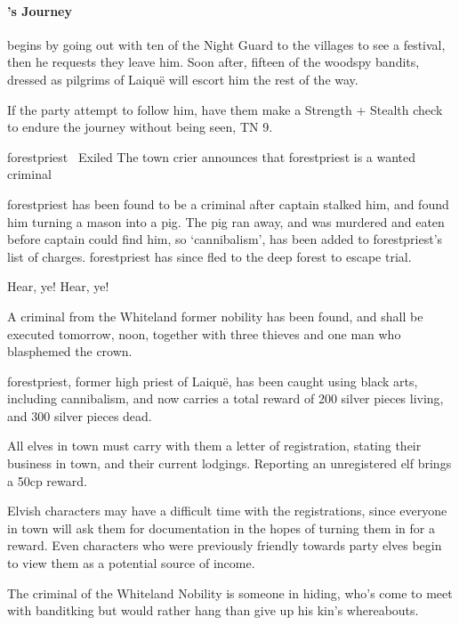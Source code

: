 \begin{multicols}{2}
\paragraph{'s Journey}
begins by going out with ten of the Night Guard to the villages to see a festival, then he requests they leave him.
Soon after, fifteen of the woodspy bandits, dressed as pilgrims of Laiqu\"e will escort him the rest of the way.

If the party attempt to follow him, have them make a Strength + Stealth check to endure the journey without being seen, TN 9.



{\Gls{forestpriest}~ Exiled}%
{The town crier announces that \gls{forestpriest} is a wanted criminal}%

\Gls{forestpriest} has been found to be a criminal after \gls{captain} stalked him, and found him turning a mason into a pig.
The pig ran away, and was murdered and eaten before \gls{captain} could find him, so `cannibalism', has been added to \gls{forestpriest}'s list of charges.
\Gls{forestpriest} has since fled to the deep forest to escape trial.

\begin{speechtext}

	Hear, ye! Hear, ye!

	A criminal from the Whiteland former nobility has been found, and shall be executed tomorrow, noon, together with three thieves and one man who blasphemed the crown.

	\Gls{forestpriest}, former high priest of Laiqu\"{e}, has been caught using black arts, including cannibalism, and now carries a total reward of 200 silver pieces living, and 300 silver pieces dead.

	All elves in town must carry with them a letter of registration, stating their business in town, and their current lodgings.  Reporting an unregistered elf brings a 50cp reward.

\end{speechtext}

Elvish characters may have a difficult time with the registrations, since everyone in town will ask them for documentation in the hopes of turning them in for a reward.
Even characters who were previously friendly towards party elves begin to view them as a potential source of income.

The criminal of the Whiteland Nobility is someone in hiding, who's come to meet with \gls{banditking} but would rather hang than give up his kin's whereabouts.


\end{multicols}
